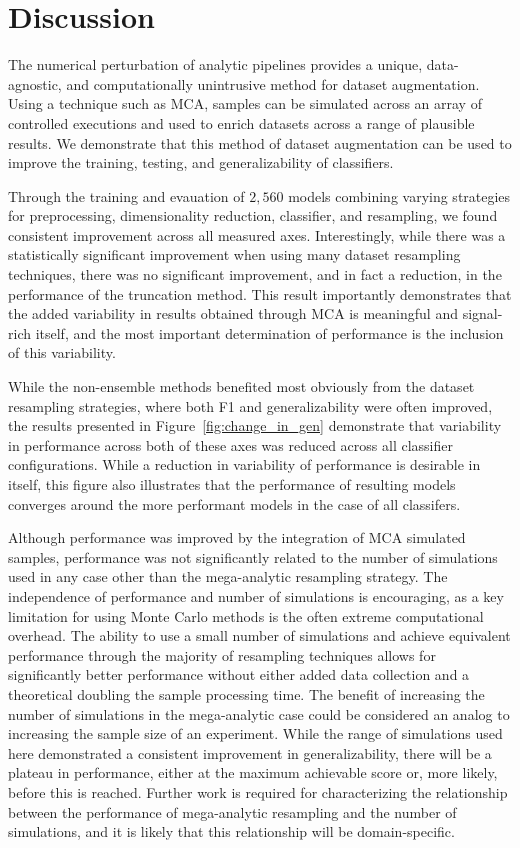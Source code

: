 \documentclass[10pt]{SelfArx} %
\begin{document}
\section*{Discussion}

The numerical perturbation of analytic pipelines provides a unique, data-agnostic, and computationally unintrusive
method for dataset augmentation. Using a technique such as MCA, samples can be simulated across an array of controlled
executions and used to enrich datasets across a range of plausible results. We demonstrate that this method of dataset
augmentation can be used to improve the training, testing, and generalizability of classifiers.

Through the training and evauation of $2,560$ models combining varying strategies for preprocessing, dimensionality
reduction, classifier, and resampling, we found consistent improvement across all measured axes. Interestingly, while
there was a statistically significant improvement when using many dataset resampling techniques, there was no
significant improvement, and in fact a reduction, in the performance of the truncation method. This result importantly
demonstrates that the added variability in results obtained through MCA is meaningful and signal-rich itself, and the
most important determination of performance is the inclusion of this variability.

While the non-ensemble methods benefited most obviously from the dataset resampling strategies, where both F1 and
generalizability were often improved, the results presented in Figure~\ref{fig:change_in_gen} demonstrate that
variability in performance across both of these axes was reduced across all classifier configurations. While a
reduction in variability of performance is desirable in itself, this figure also illustrates that the performance of
resulting models converges around the more performant models in the case of all classifers.

Although performance was improved by the integration of MCA simulated samples, performance was not significantly
related to the number of simulations used in any case other than the mega-analytic resampling strategy. The
independence of performance and number of simulations is encouraging, as a key limitation for using Monte Carlo methods
is the often extreme computational overhead. The ability to use a small number of simulations and achieve equivalent
performance through the majority of resampling techniques allows for significantly better performance without either
added data collection and a theoretical doubling the sample processing time. The benefit of increasing the number of
simulations in the mega-analytic case could be considered an analog to increasing the sample size of an experiment.
While the range of simulations used here demonstrated a consistent improvement in generalizability, there will be a
plateau in performance, either at the maximum achievable score or, more likely, before this is reached. Further
work is required for characterizing the relationship between the performance of mega-analytic resampling and the number
of simulations, and it is likely that this relationship will be domain-specific.
\end{document}
